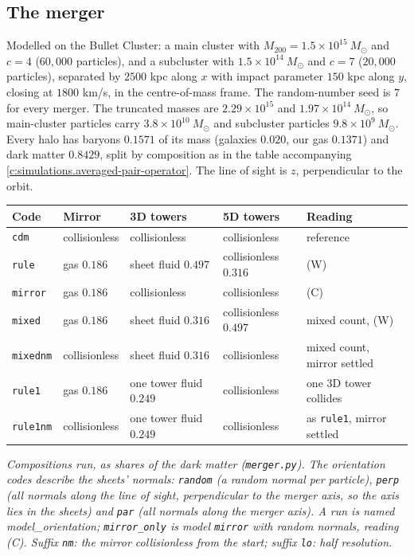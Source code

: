 \documentclass[11pt]{article}
\theoremstyle{definition}
\theoremstyle{plain}
\providecommand{\Msun}{}\renewcommand{\Msun}{M_{\odot}}
\providecommand{\file}{}\renewcommand{\file}[1]{\texttt{#1}}
\begin{document}
\subsection*{The merger}
\label{c:note.simulations.setting-merger}
Modelled on the Bullet Cluster: a main cluster with $M_{200} = 1.5 \times 10^{15}\ \Msun$ and $c = 4$ ($60{,}000$ particles), and a subcluster with $1.5 \times 10^{14}\ \Msun$ and $c = 7$ ($20{,}000$ particles), separated by $2500$ kpc along $x$ with impact parameter $150$ kpc along $y$, closing at $1800$ km/s, in the centre-of-mass frame. The random-number seed is $7$ for every merger. The truncated masses are $2.29 \times 10^{15}$ and $1.97 \times 10^{14}\ \Msun$, so main-cluster particles carry $3.8 \times 10^{10}\ \Msun$ and subcluster particles $9.8 \times 10^{9}\ \Msun$. Every halo has baryons $0.1571$ of its mass (galaxies $0.020$, our gas $0.1371$) and dark matter $0.8429$, split by composition as in the table accompanying \ref{c:simulations.averaged-pair-operator}. The line of sight is $z$, perpendicular to the orbit.

\centering \begin{tabular}{@{}lllll@{}}
\toprule
Code & Mirror & 3D towers & 5D towers & Reading \\
\midrule
\texttt{cdm} & collisionless & collisionless & collisionless & reference \\
\texttt{rule} & gas $0.186$ & sheet fluid $0.497$ & collisionless $0.316$ & (W) \\
\texttt{mirror} & gas $0.186$ & collisionless & collisionless & (C) \\
\texttt{mixed} & gas $0.186$ & sheet fluid $0.316$ & collisionless $0.497$ & mixed count, (W) \\
\texttt{mixednm} & collisionless & sheet fluid $0.316$ & collisionless & mixed count, mirror settled \\
\texttt{rule1} & gas $0.186$ & one tower fluid $0.249$ & collisionless & one 3D tower collides \\
\texttt{rule1nm} & collisionless & one tower fluid $0.249$ & collisionless & as \texttt{rule1}, mirror settled \\
\bottomrule
\end{tabular}

\emph{Compositions run, as shares of the dark matter (\file{merger.py}). The orientation codes describe the sheets' normals: \texttt{random} (a random normal per particle), \texttt{perp} (all normals along the line of sight, perpendicular to the merger axis, so the axis lies in the sheets) and \texttt{par} (all normals along the merger axis). A run is named \emph{model\_orientation}; \texttt{mirror\_only} is model \texttt{mirror} with random normals, reading (C). Suffix \texttt{nm}: the mirror collisionless from the start; suffix \texttt{lo}: half resolution.}
\end{document}
